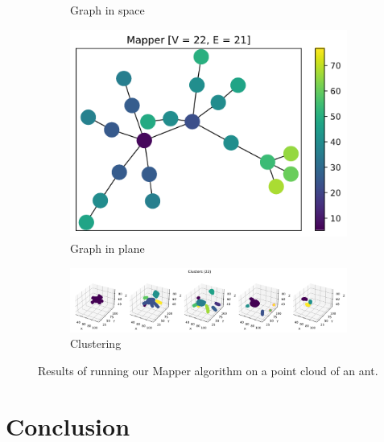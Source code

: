 \documentclass{article}
\begin{document}
\begin{figure}[ht]
\begin{subfigure}[c]{0.3\columnwidth}
        \caption{Graph in space}
        \label{fig:ant-space}
    \end{subfigure}
    \begin{subfigure}[c]{0.3\columnwidth}
        \centering
        \includegraphics[width=\textwidth]{ant-graph-2d}
        \caption{Graph in plane}
        \label{fig:ant-plane}
    \end{subfigure}
    \begin{subfigure}[c]{0.9\columnwidth}
        \centering
        \includegraphics[width=\textwidth]{ant-clusters}
        \caption{Clustering}
        \label{fig:ant-cluster}
    \end{subfigure}
    \caption{Results of running our Mapper algorithm on a point cloud of an ant.}
    \label{fig:ant}
\end{figure}

\section{Conclusion}\label{sec:concl}



\end{document}
